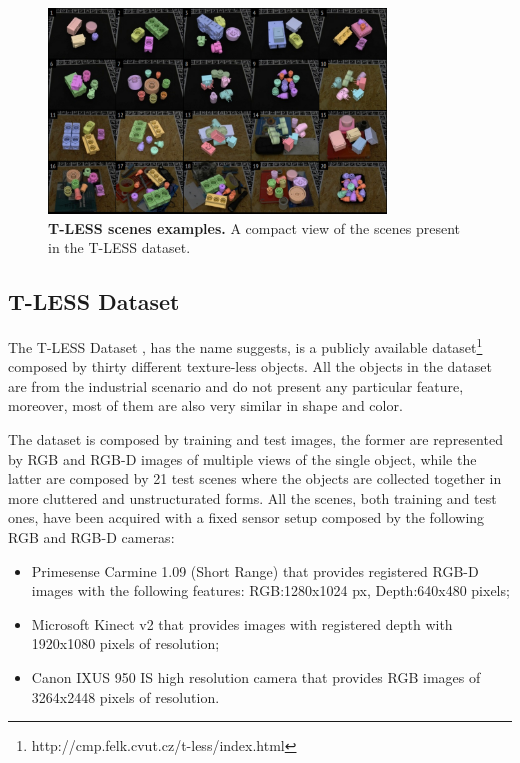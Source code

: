 \begin{figure}
    \centering
    \includegraphics[width=0.8\textwidth]{figures/2_benchmarks_and_metrics/tless_ex_scenes}
    \caption{\textbf{T-LESS scenes examples.} A compact view of the scenes present in the T-LESS dataset.}
    \label{fig:tless_ex_scene}
\end{figure}

\subsection{T-LESS Dataset}\label{subsec:tless_dataset}
The T-LESS Dataset \cite{hodan2017tless}, has the name suggests, is a publicly available dataset\footnote{http://cmp.felk.cvut.cz/t-less/index.html} composed by thirty different texture-less objects. All the objects in the dataset are from the industrial scenario and do not present any particular feature, moreover, most of them are also very similar in shape and color.

The dataset is composed by training and test images, the former are represented by RGB and RGB-D images of multiple views of the single object, while the latter are composed by 21 test scenes where the objects are collected together in more cluttered and unstructurated forms. All the scenes, both training and test ones, have been acquired with a fixed sensor setup composed by the following RGB and RGB-D cameras:

\begin{itemize}
	\item Primesense Carmine 1.09 (Short Range) that provides registered RGB-D images with the following features: RGB:1280x1024 px, Depth:640x480 pixels;
	\item Microsoft Kinect v2 that provides images with registered depth with 1920x1080 pixels of resolution;
	\item Canon IXUS 950 IS high resolution camera that provides RGB images of 3264x2448 pixels of resolution.
\end{itemize}

